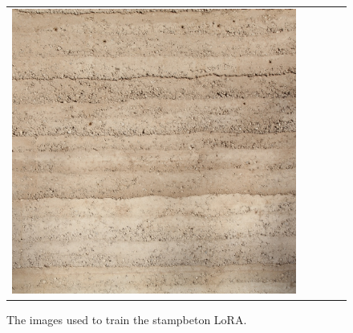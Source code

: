 \begin{figure}[H]
{\begin{tabular}{@{}ccccc@{}}
      \includegraphics[width=\linewidth]{Images/LoRAs/STAMPBETON/Training_images/15.jpg} \\
    \end{tabular}
  }
  \caption{The images used to train the stampbeton LoRA.}
  \label{fig:gridstampbeton}
\end{figure}


